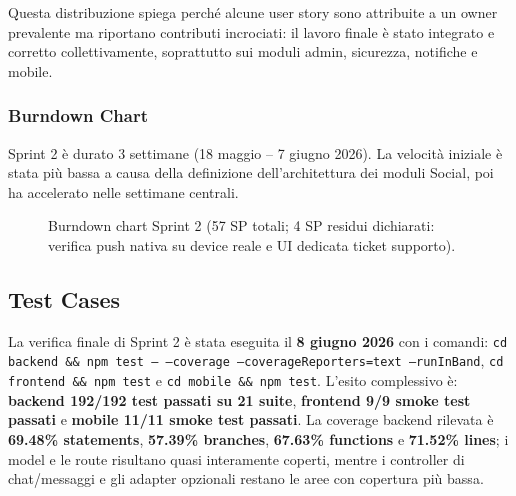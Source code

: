 \documentclass[11pt,a4paper]{article}
\newcommand{\code}[1]{\texttt{#1}}
\begin{document}
Questa distribuzione spiega perché alcune user story sono attribuite a un owner prevalente ma riportano contributi incrociati: il lavoro finale è stato integrato e corretto collettivamente, soprattutto sui moduli admin, sicurezza, notifiche e mobile.

\subsubsection*{Burndown Chart}

Sprint 2 è durato 3 settimane (18 maggio -- 7 giugno 2026). La velocità iniziale è stata più bassa a causa della definizione dell'architettura dei moduli Social, poi ha accelerato nelle settimane centrali.

\begin{figure}[H]
\centering
{}
\caption{Burndown chart Sprint 2 (57 SP totali; 4 SP residui dichiarati: verifica push nativa su device reale e UI dedicata ticket supporto).}
\end{figure}

\subsection{Test Cases}

La verifica finale di Sprint 2 è stata eseguita il \textbf{8 giugno 2026} con i comandi:
\code{cd backend \&\& npm test -- --coverage --coverageReporters=text --runInBand},
\code{cd frontend \&\& npm test} e \code{cd mobile \&\& npm test}. L'esito complessivo è:
\textbf{backend 192/192 test passati su 21 suite}, \textbf{frontend 9/9 smoke test passati} e
\textbf{mobile 11/11 smoke test passati}. La coverage backend rilevata è
\textbf{69.48\% statements}, \textbf{57.39\% branches}, \textbf{67.63\% functions} e
\textbf{71.52\% lines}; i model e le route risultano quasi interamente coperti, mentre i controller
di chat/messaggi e gli adapter opzionali restano le aree con copertura più bassa.
\end{document}
